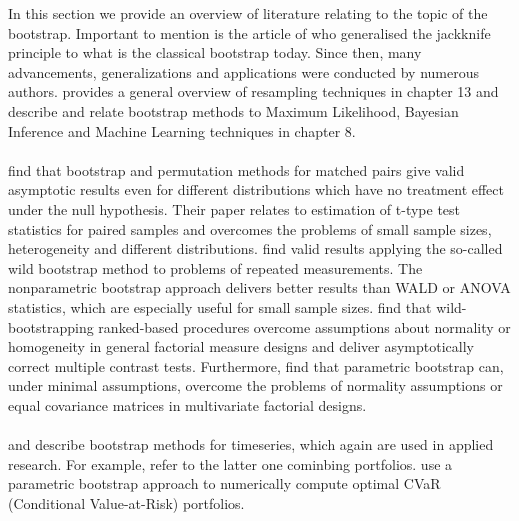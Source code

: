In this section we provide an overview of literature relating to the topic of the bootstrap. Important to mention is the article of \citet{boot1} who generalised the jackknife principle to what is the classical bootstrap today. Since then, many advancements, generalizations and applications were conducted by numerous authors. \citet{prob1} provides a general overview of resampling techniques in chapter 13 and \citet{stat1} describe and relate bootstrap methods to Maximum Likelihood, Bayesian Inference and Machine Learning techniques in chapter 8. \\
\\
\noindent \citet{boot4} find that bootstrap and permutation methods for matched pairs give valid asymptotic results even for different distributions which have no treatment effect under the null hypothesis. Their paper relates to estimation of t-type test statistics for paired samples and overcomes the problems of small sample sizes, heterogeneity and different distributions. \citet{boot2} find valid results applying the so-called wild bootstrap method to problems of repeated measurements. The nonparametric bootstrap approach delivers better results than WALD or ANOVA statistics, which are especially useful for small sample sizes. \citet{boot3} find that wild-bootstrapping ranked-based procedures overcome assumptions about normality or homogeneity in general factorial measure designs and deliver asymptotically correct multiple contrast tests. Furthermore, \citet{boot5} find that parametric bootstrap can, under minimal assumptions, overcome the problems of normality assumptions or equal covariance matrices in multivariate factorial designs. \\
\\
\noindent \citet{boot6} and \citet{boot7} describe bootstrap methods for timeseries, which again are used in applied research. For example, \citet{alla} refer to the latter one cominbing portfolios. \citet{erin} use a parametric bootstrap approach to numerically compute optimal CVaR (Conditional Value-at-Risk) portfolios.

